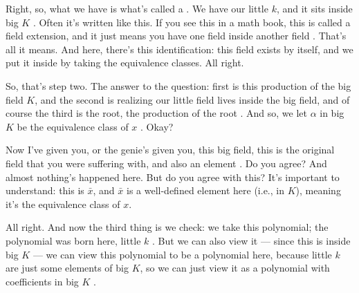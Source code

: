 \begin{speech}[01:11:18 - 01:13:26]
Right, so, what we have is what's called a . We have our little $k$, and it sits inside big $K$ . Often it's written like this. If you see this in a math book, this is called a field extension, and it just means you have one field inside another field . That's all it means. And here, there's this identification: this field exists by itself, and we put it inside by taking the equivalence classes. All right.

So, that's step two. The answer to the question: first is this production of the big field $K$, and the second is realizing our little field lives inside the big field, and of course the third is the root, the production of the root . And so, we let $\alpha$ in big $K$ be the equivalence class of $x$ . Okay?

Now I've given you, or the genie's given you, this big field, this is the original field that you were suffering with, and also an element . Do you agree? And almost nothing's happened here. But do you agree with this? It's important to understand: this is $\bar{x}$, and $\bar{x}$ is a well-defined element here (i.e., in $K$), meaning it's the equivalence class of $x$.

All right. And now the third thing is we check: we take this polynomial; the polynomial was born here, little $k$ . But we can also view it --- since this is inside big $K$ --- we can view this polynomial to be a polynomial here, because little $k$ are just some elements of big $K$, so we can just view it as a polynomial with coefficients in big $K$ .
\end{speech}

